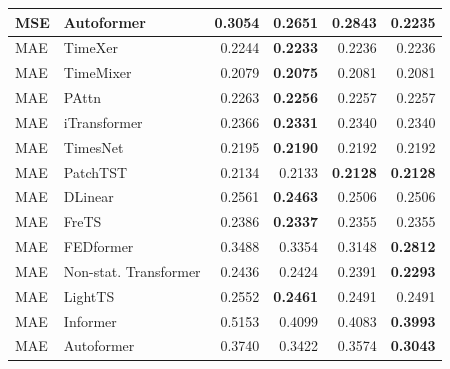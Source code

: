\begin{longtable}{llrrrr}
MSE & Autoformer & 0.3054 & 0.2651 & 0.2843 & \textbf{0.2235} \\
\midrule
MAE & TimeXer & 0.2244 & \textbf{0.2233} & 0.2236 & 0.2236 \\
MAE & TimeMixer & 0.2079 & \textbf{0.2075} & 0.2081 & 0.2081 \\
MAE & PAttn & 0.2263 & \textbf{0.2256} & 0.2257 & 0.2257 \\
MAE & iTransformer & 0.2366 & \textbf{0.2331} & 0.2340 & 0.2340 \\
MAE & TimesNet & 0.2195 & \textbf{0.2190} & 0.2192 & 0.2192 \\
MAE & PatchTST & 0.2134 & 0.2133 & \textbf{0.2128} & \textbf{0.2128} \\
MAE & DLinear & 0.2561 & \textbf{0.2463} & 0.2506 & 0.2506 \\
MAE & FreTS & 0.2386 & \textbf{0.2337} & 0.2355 & 0.2355 \\
MAE & FEDformer & 0.3488 & 0.3354 & 0.3148 & \textbf{0.2812} \\
MAE & Non-stat. Transformer & 0.2436 & 0.2424 & 0.2391 & \textbf{0.2293} \\
MAE & LightTS & 0.2552 & \textbf{0.2461} & 0.2491 & 0.2491 \\
MAE & Informer & 0.5153 & 0.4099 & 0.4083 & \textbf{0.3993} \\
MAE & Autoformer & 0.3740 & 0.3422 & 0.3574 & \textbf{0.3043} \\
\end{longtable}
\endgroup

